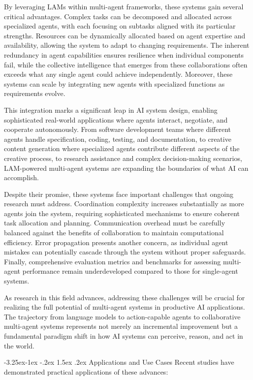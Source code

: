 \documentclass[journal,twoside,10pt]{IEEEtran}
\makeatletter
\renewcommand\subsection{\@startsection{subsection}{2}{\z@}%
                       {-3.25ex\@plus -1ex \@minus -.2ex}%
                       {1.5ex \@plus .2ex}%
                       {\normalfont\large\bfseries}}
\makeatother
\begin{document}
By leveraging LAMs within multi-agent frameworks, these systems gain several critical advantages. Complex tasks can be decomposed and allocated across specialized agents, with each focusing on subtasks aligned with its particular strengths. Resources can be dynamically allocated based on agent expertise and availability, allowing the system to adapt to changing requirements. The inherent redundancy in agent capabilities ensures resilience when individual components fail, while the collective intelligence that emerges from these collaborations often exceeds what any single agent could achieve independently. Moreover, these systems can scale by integrating new agents with specialized functions as requirements evolve.

This integration marks a significant leap in AI system design, enabling sophisticated real-world applications where agents interact, negotiate, and cooperate autonomously. From software development teams where different agents handle specification, coding, testing, and documentation, to creative content generation where specialized agents contribute different aspects of the creative process, to research assistance and complex decision-making scenarios, LAM-powered multi-agent systems are expanding the boundaries of what AI can accomplish.

Despite their promise, these systems face important challenges that ongoing research must address. Coordination complexity increases substantially as more agents join the system, requiring sophisticated mechanisms to ensure coherent task allocation and planning. Communication overhead must be carefully balanced against the benefits of collaboration to maintain computational efficiency. Error propagation presents another concern, as individual agent mistakes can potentially cascade through the system without proper safeguards. Finally, comprehensive evaluation metrics and benchmarks for assessing multi-agent performance remain underdeveloped compared to those for single-agent systems.

As research in this field advances, addressing these challenges will be crucial for realizing the full potential of multi-agent systems in productive AI applications. The trajectory from language models to action-capable agents to collaborative multi-agent systems represents not merely an incremental improvement but a fundamental paradigm shift in how AI systems can perceive, reason, and act in the world.

\subsection{Applications and Use Cases}
Recent studies have demonstrated practical applications of these advances:
\end{document}
